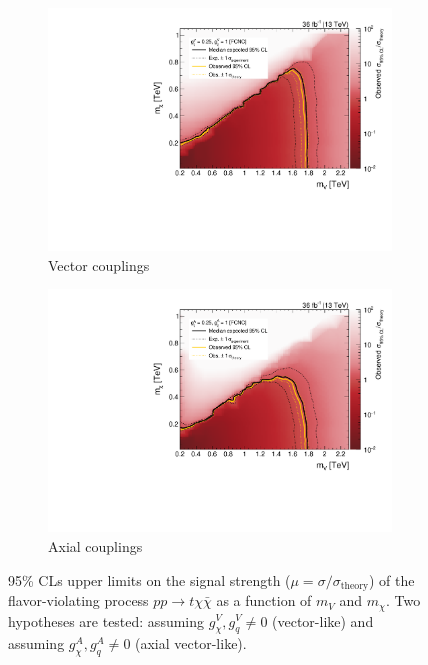 \begin{figure}[]
    \begin{center}
        \begin{subfigure}[t]{0.49\textwidth}
            \includegraphics[width=\textwidth]{figures/monotop/results/fcnc2d_obs_vector.pdf}
            \caption{Vector couplings}
        \end{subfigure}
        \begin{subfigure}[t]{0.49\textwidth}
            \includegraphics[width=\textwidth]{figures/monotop/results/fcnc2d_obs_axial.pdf}
            \caption{Axial couplings}
        \end{subfigure}
        \caption{95\% CLs upper limits on the signal strength ($\mu=\sigma/\sigma_\mathrm{theory}$) of the flavor-violating process $pp \rightarrow t \chi\bar\chi$ as a function of $m_V$ and $m_\chi$.
                 Two hypotheses are tested: assuming $g_\chi^V,g_q^V \neq 0$ (vector-like) and assuming $g_\chi^A,g_q^A\neq0$ (axial vector-like).}
        \label{fig:mt:fcnc_obs_mm}
    \end{center}
\end{figure}

